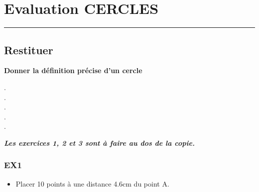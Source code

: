 \documentclass[11pt]{article}
\newcommand{\horrule}[1]{\rule{\linewidth}{#1}} %
\begin{document}

\newtheorem{Definition}{Définition}
\newtheorem{Theorem}{Théorème}
\newtheorem{Proposition}{Propriété}

\renewcommand{\labelitemi}{$\bullet$}
\renewcommand{\labelitemii}{$\circ$}

\setlength{\columnseprule}{0pt}

\section*{Evaluation CERCLES}

\horrule{2px} 

\subsection*{Restituer}
\textbf{Donner la définition précise d'un cercle}\\
\begin{minipage}{\linewidth}
\vspace{18pt}
. \dotfill \vspace{12pt} \\
. \dotfill \vspace{12pt} \\
. \dotfill \vspace{12pt} \\
. \dotfill \vspace{12pt} \\
. \dotfill \vspace{12pt} \\
\end{minipage}

\textbf{\textit{Les exercices 1, 2 et 3 sont à faire au dos de la copie.}}

\subsubsection*{EX1}
	\begin{itemize}
	\item Placer 10 points à une distance 4.6cm du point A.
	\end{itemize}
\end{document}
